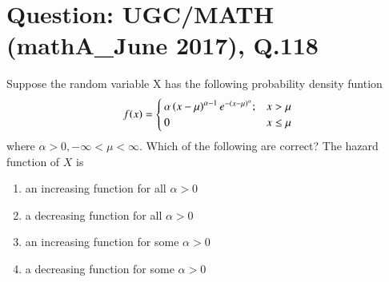 \documentclass[journal,12pt,twocolumn]{IEEEtran}
\begin{document}
\section*{Question: UGC/MATH (mathA\_June 2017), Q.118}
Suppose the random variable X has the following probability density funtion 
\begin{align}
    f(x)=\begin{cases}\alpha\left(x-\mu\right)^{\alpha -1}e^{-\left(x-\mu\right)^\alpha};&x>\mu\\
                        0                               &x\leq\mu    
    \end{cases}\nonumber
\end{align}
where $\alpha>0,-\infty <\mu<\infty$. Which of the following are correct? The hazard function of $X$ is
\begin{enumerate}
    \item an increasing function for all $\alpha>0$
    \item a decreasing function for all $\alpha >0$
    \item an increasing function for some $\alpha>0$
    \item a decreasing function for some $\alpha>0$
\end{enumerate}
\end{document}
